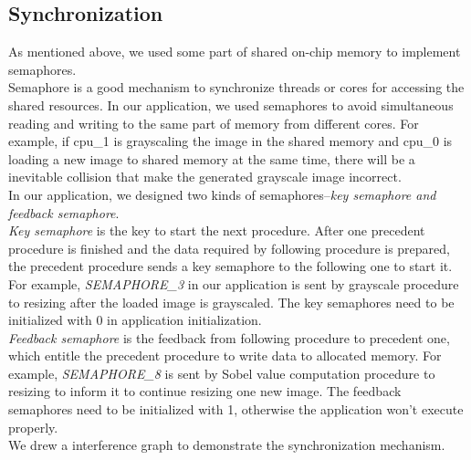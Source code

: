 \documentclass[conference]{IEEEtran}
\begin{document}
\subsection{Synchronization}
As mentioned above, we used some part of shared on-chip memory to implement semaphores.\\
\indent
Semaphore is a good mechanism to synchronize threads or cores for accessing the shared resources. In our application, we used semaphores to avoid simultaneous reading and writing to the same part of memory from different cores. For example, if cpu\_1 is grayscaling the image in the shared memory and cpu\_0 is loading a new image to shared memory at the same time, there will be a inevitable collision that make the generated grayscale image incorrect.\\
\indent
In our application, we designed two kinds of semaphores--\emph{key semaphore and feedback semaphore}.\\
\indent
\emph{Key semaphore} is the key to start the next procedure. After one precedent procedure is finished and the data required by following procedure is prepared, the precedent procedure sends a key semaphore to the following one to start it. For example, \emph{SEMAPHORE\_3} in our application is sent by grayscale procedure to resizing after the loaded image is grayscaled. The key semaphores need to be initialized with 0 in application initialization.\\
\indent
\emph{Feedback semaphore} is the feedback from following procedure to precedent one, which entitle the precedent procedure to write data to allocated memory. For example, \emph{SEMAPHORE\_8} is sent by Sobel value computation procedure to resizing to inform it to continue resizing one new image. The feedback semaphores need to be initialized with 1, otherwise the application won't execute properly.\\
\indent
We drew a interference graph to demonstrate the synchronization mechanism.
\end{document}
